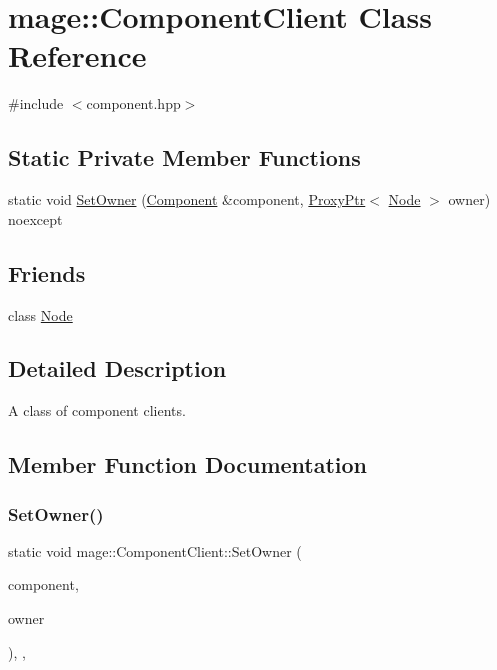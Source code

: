 \hypertarget{classmage_1_1_component_client}{}\section{mage\+:\+:Component\+Client Class Reference}
\label{classmage_1_1_component_client}


{\ttfamily \#include $<$component.\+hpp$>$}

\subsection*{Static Private Member Functions}
\begin{DoxyCompactItemize}
\item 
static void \mbox{\hyperlink{classmage_1_1_component_client_a268413a2179e0f29ac78b0c5f26ecaca}{Set\+Owner}} (\mbox{\hyperlink{classmage_1_1_component}{Component}} \&component, \mbox{\hyperlink{classmage_1_1_proxy_ptr}{Proxy\+Ptr}}$<$ \mbox{\hyperlink{classmage_1_1_node}{Node}} $>$ owner) noexcept
\end{DoxyCompactItemize}
\subsection*{Friends}
\begin{DoxyCompactItemize}
\item 
class \mbox{\hyperlink{classmage_1_1_component_client_a6db9d28bd448a131448276ee03de1e6d}{Node}}
\end{DoxyCompactItemize}


\subsection{Detailed Description}
A class of component clients. 

\subsection{Member Function Documentation}
\mbox{\label{classmage_1_1_component_client_a268413a2179e0f29ac78b0c5f26ecaca}} 
\subsubsection{\texorpdfstring{Set\+Owner()}{SetOwner()}}
{\footnotesize\ttfamily static void mage\+::\+Component\+Client\+::\+Set\+Owner (\begin{DoxyParamCaption}\item[{\mbox{\hyperlink{classmage_1_1_component}{Component}} \&}]{component,  }\item[{\mbox{\hyperlink{classmage_1_1_proxy_ptr}{Proxy\+Ptr}}$<$ \mbox{\hyperlink{classmage_1_1_node}{Node}} $>$}]{owner }\end{DoxyParamCaption})\hspace{0.3cm}{\ttfamily [static]}, {\ttfamily [private]}, {\ttfamily [noexcept]}}

